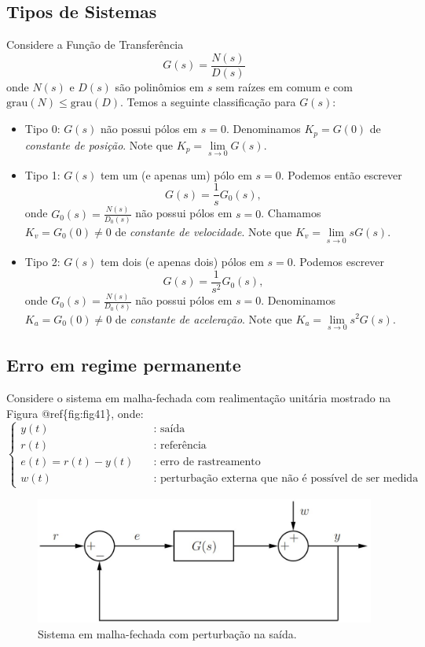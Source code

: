 \documentclass[
]{book}
\providecommand{\tightlist}{%
  \setlength{\itemsep}{0pt}\setlength{\parskip}{0pt}}
\begin{document}
\hypertarget{tipos-de-sistemas}{%
\subsection{Tipos de Sistemas}\label{tipos-de-sistemas}}

Considere a Função de Transferência
\[
G(s) = \frac {N(s)}{D(s)}
\]
onde \(N(s)\) e \(D(s)\) são polinômios em \(s\) sem raízes em comum e com \(\text{grau}(N) \leq \text{grau}(D)\). Temos a seguinte classificação para \(G(s)\):

\begin{itemize}
\tightlist
\item
  Tipo 0: \(G(s)\) não possui pólos em \(s=0\). Denominamos \(K_p = G(0)\) de \emph{constante de posição}. Note que \(K_p = \lim\limits_{s \to 0} G(s)\).
\item
  Tipo 1: \(G(s)\) tem um (e apenas um) pólo em \(s=0\). Podemos então escrever \[G(s) = \frac {1}{s}G_0(s),\] onde \(G_0(s) = \frac {N(s)}{D_0(s)}\) não possui pólos em \(s=0\). Chamamos \(K_v= G_0(0) \neq 0\) de \emph{constante de velocidade}. Note que \(K_v = \lim\limits_{s \to 0} sG(s)\).
\item
  Tipo 2: \(G(s)\) tem dois (e apenas dois) pólos em \(s=0\). Podemos escrever \[G(s) = \frac {1}{s^2}G_0(s),\] onde \(G_0(s) = \frac {N(s)}{D_0(s)}\) não possui pólos em \(s=0\). Denominamos \(K_a = G_0(0) \neq 0\) de \emph{constante de aceleração}. Note que \(K_a =\lim\limits_{s \to 0} s^2G(s)\).
\end{itemize}

\hypertarget{erro-em-regime-permanente}{%
\subsection{Erro em regime permanente}\label{erro-em-regime-permanente}}

Considere o sistema em malha-fechada com realimentação unitária mostrado na Figura @ref\{fig:fig41\}, onde:
\[
\begin{cases}
  y(t) & \quad \text{: saída}\\
  r(t) & \quad \text{: referência}\\
  e(t) = r(t)-y(t) & \quad \text{: erro de rastreamento}\\
  w(t) &\quad \text{: perturbação externa que não é possível de ser medida}
\end{cases}
\]

\begin{figure}
\includegraphics[width=0.8\linewidth]{Imagens/Lab4/Apresentação/fig1} \caption{Sistema em malha-fechada com perturbação na saída.}\label{fig:fig41}
\end{figure}
\end{document}
